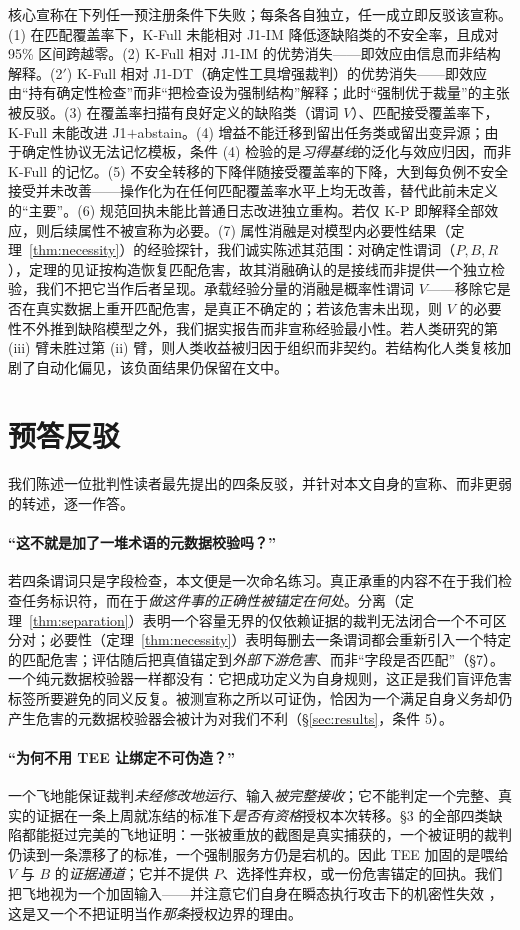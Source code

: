 \documentclass[11pt]{ctexart}
\begin{document}
核心宣称在下列任一预注册条件下失败；每条各自独立，任一成立即反驳该宣称。(1) 在匹配覆盖率下，K-Full 未能相对 J1-IM 降低逐缺陷类的不安全率，且成对 95\% 区间跨越零。(2) K-Full 相对 J1-IM 的优势消失——即效应由信息而非结构解释。(2$'$) K-Full 相对 J1-DT（确定性工具增强裁判）的优势消失——即效应由“持有确定性检查”而非“把检查设为强制结构”解释；此时“强制优于裁量”的主张被反驳。(3) 在覆盖率扫描有良好定义的缺陷类（谓词 $V$）、匹配接受覆盖率下，K-Full 未能改进 J1$+$abstain。(4) 增益不能迁移到留出任务类或留出变异源；由于确定性协议无法记忆模板，条件 (4) 检验的是\emph{习得基线}的泛化与效应归因，而非 K-Full 的记忆。(5) 不安全转移的下降伴随接受覆盖率的下降，大到每负例不安全接受并未改善——操作化为在任何匹配覆盖率水平上均无改善，替代此前未定义的“主要”。(6) 规范回执未能比普通日志改进独立重构。若仅 K-P 即解释全部效应，则后续属性不被宣称为必要。(7) 属性消融是对模型内必要性结果（定理~\ref{thm:necessity}）的经验探针，我们诚实陈述其范围：对确定性谓词（$P,B,R$），定理的见证按构造恢复匹配危害，故其消融确认的是接线而非提供一个独立检验，我们不把它当作后者呈现。承载经验分量的消融是概率性谓词 $V$——移除它是否在真实数据上重开匹配危害，是真正不确定的；若该危害未出现，则 $V$ 的必要性不外推到缺陷模型之外，我们据实报告而非宣称经验最小性。若人类研究的第 (iii) 臂未胜过第 (ii) 臂，则人类收益被归因于组织而非契约。若结构化人类复核加剧了自动化偏见，该负面结果仍保留在文中。

\section{预答反驳}
\label{sec:objections}
我们陈述一位批判性读者最先提出的四条反驳，并针对本文自身的宣称、而非更弱的转述，逐一作答。

\paragraph{“这不就是加了一堆术语的元数据校验吗？”} 若四条谓词只是字段检查，本文便是一次命名练习。真正承重的内容不在于我们检查任务标识符，而在于\emph{做这件事的正确性被锚定在何处}。分离（定理~\ref{thm:separation}）表明一个容量无界的仅依赖证据的裁判无法闭合一个不可区分对；必要性（定理~\ref{thm:necessity}）表明每删去一条谓词都会重新引入一个特定的匹配危害；评估随后把真值锚定到\emph{外部下游危害}、而非“字段是否匹配”（\S7）。一个纯元数据校验器一样都没有：它把成功定义为自身规则，这正是我们盲评危害标签所要避免的同义反复。被测宣称之所以可证伪，恰因为一个满足自身义务却仍产生危害的元数据校验器会被计为对我们不利（\S\ref{sec:results}，条件 5）。

\paragraph{“为何不用 TEE 让绑定不可伪造？”} 一个飞地能保证裁判\emph{未经修改地运行}、输入\emph{被完整接收}；它不能判定一个完整、真实的证据在一条上周就冻结的标准下\emph{是否有资格}授权本次转移。\S3 的全部四类缺陷都能挺过完美的飞地证明：一张被重放的截图是真实捕获的，一个被证明的裁判仍读到一条漂移了的标准，一个强制服务方仍是宕机的。因此 TEE 加固的是喂给 $V$ 与 $B$ 的\emph{证据通道}；它并不提供 $P$、选择性弃权，或一份危害锚定的回执。我们把飞地视为一个加固输入——并注意它们自身在瞬态执行攻击下的机密性失效 \cite{vanbulck2018foreshadow}，这是又一个不把证明当作\emph{那条}授权边界的理由。
\end{document}

